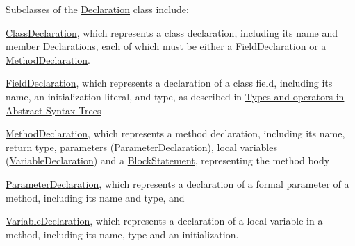Subclasses of the \hyperlink{classDeclaration}{Declaration} class include:
\begin{DoxyItemize}
\item \hyperlink{classClassDeclaration}{ClassDeclaration}, which represents a class declaration, including its name and member Declarations, each of which must be either a \hyperlink{classFieldDeclaration}{FieldDeclaration} or a \hyperlink{classMethodDeclaration}{MethodDeclaration}.
\item \hyperlink{classFieldDeclaration}{FieldDeclaration}, which represents a declaration of a class field, including its name, an initialization literal, and type, as described in \hyperlink{main_TYPES}{Types and operators in Abstract Syntax Trees}
\item \hyperlink{classMethodDeclaration}{MethodDeclaration}, which represents a method declaration, including its name, return type, parameters (\hyperlink{classParameterDeclaration}{ParameterDeclaration}), local variables (\hyperlink{classVariableDeclaration}{VariableDeclaration}) and a \hyperlink{classBlockStatement}{BlockStatement}, representing the method body
\item \hyperlink{classParameterDeclaration}{ParameterDeclaration}, which represents a declaration of a formal parameter of a method, including its name and type, and
\item \hyperlink{classVariableDeclaration}{VariableDeclaration}, which represents a declaration of a local variable in a method, including its name, type and an initialization.
\end{DoxyItemize}

